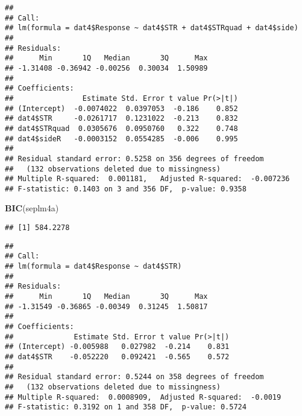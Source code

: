\documentclass[
]{article}
\newenvironment{Shaded}{\begin{snugshade}}{\end{snugshade}}
\newcommand{\KeywordTok}[1]{\textcolor[rgb]{0.13,0.29,0.53}{\textbf{#1}}}
\newcommand{\NormalTok}[1]{#1}
\newcommand{\OperatorTok}[1]{\textcolor[rgb]{0.81,0.36,0.00}{\textbf{#1}}}
\newcommand{\StringTok}[1]{\textcolor[rgb]{0.31,0.60,0.02}{#1}}
\begin{document}
\begin{verbatim}
## 
## Call:
## lm(formula = dat4$Response ~ dat4$STR + dat4$STRquad + dat4$side)
## 
## Residuals:
##      Min       1Q   Median       3Q      Max 
## -1.31408 -0.36942 -0.00256  0.30034  1.50989 
## 
## Coefficients:
##                Estimate Std. Error t value Pr(>|t|)
## (Intercept)  -0.0074022  0.0397053  -0.186    0.852
## dat4$STR     -0.0261717  0.1231022  -0.213    0.832
## dat4$STRquad  0.0305676  0.0950760   0.322    0.748
## dat4$sideR   -0.0003152  0.0554285  -0.006    0.995
## 
## Residual standard error: 0.5258 on 356 degrees of freedom
##   (132 observations deleted due to missingness)
## Multiple R-squared:  0.001181,   Adjusted R-squared:  -0.007236 
## F-statistic: 0.1403 on 3 and 356 DF,  p-value: 0.9358
\end{verbatim}

\begin{Shaded}
\begin{Highlighting}[]
\KeywordTok{BIC}\NormalTok{(seplm4a)}
\end{Highlighting}
\end{Shaded}

\begin{verbatim}
## [1] 584.2278
\end{verbatim}

\begin{Shaded}
\end{Shaded}

\begin{verbatim}
## 
## Call:
## lm(formula = dat4$Response ~ dat4$STR)
## 
## Residuals:
##      Min       1Q   Median       3Q      Max 
## -1.31549 -0.36865 -0.00349  0.31245  1.50817 
## 
## Coefficients:
##              Estimate Std. Error t value Pr(>|t|)
## (Intercept) -0.005988   0.027982  -0.214    0.831
## dat4$STR    -0.052220   0.092421  -0.565    0.572
## 
## Residual standard error: 0.5244 on 358 degrees of freedom
##   (132 observations deleted due to missingness)
## Multiple R-squared:  0.0008909,  Adjusted R-squared:  -0.0019 
## F-statistic: 0.3192 on 1 and 358 DF,  p-value: 0.5724
\end{verbatim}
\end{document}
